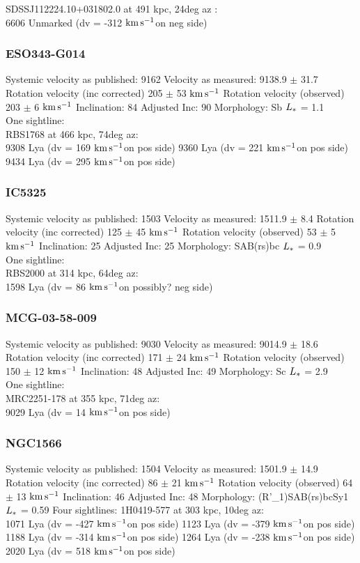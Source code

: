 \documentclass[iop]{emulateapj-rtx4}
\newcommand{\kms}{$\rm km\, s^{-1}$}
\begin{document}
SDSSJ112224.10+031802.0 at 491 kpc, 24deg az : \\
6606 Unmarked (dv = -312 \kms on neg side)



\subsubsection{ESO343-G014}
Systemic velocity as published: 9162
Velocity as measured: 9138.9 $\pm$ 31.7
Rotation velocity (inc corrected) 205 $\pm$ 53 \kms
Rotation velocity (observed) 203 $\pm$ 6 \kms
Inclination: 84
Adjusted Inc: 90
Morphology: Sb
$L_{\**}$ = 1.1 \\

One sightline: \\
RBS1768 at 466 kpc, 74deg az: \\
9308 Lya (dv = 169 \kms on pos side)
9360 Lya (dv = 221 \kms on pos side)
9434 Lya (dv = 295 \kms on pos side)


\subsubsection{IC5325}
Systemic velocity as published: 1503
Velocity as measured: 1511.9 $\pm$ 8.4
Rotation velocity (inc corrected) 125 $\pm$ 45 \kms
Rotation velocity (observed) 53 $\pm$ 5 \kms
Inclination: 25
Adjusted Inc: 25
Morphology: SAB(rs)bc
$L_{\**}$ = 0.9 \\

One sightline: \\
RBS2000 at 314 kpc, 64deg az: \\
1598 Lya (dv = 86 \kms on possibly? neg side)


\subsubsection{MCG-03-58-009}
Systemic velocity as published: 9030
Velocity as measured: 9014.9 $\pm$ 18.6
Rotation velocity (inc corrected) 171 $\pm$ 24 \kms
Rotation velocity (observed) 150 $\pm$ 12 \kms
Inclination: 48
Adjusted Inc: 49
Morphology: Sc
$L_{\**}$ = 2.9 \\

One sightline: \\
MRC2251-178 at 355 kpc, 71deg az: \\
9029 Lya (dv = 14 \kms on pos side)



\subsubsection{NGC1566}
Systemic velocity as published: 1504
Velocity as measured: 1501.9 $\pm$ 14.9
Rotation velocity (inc corrected) 86 $\pm$ 21 \kms
Rotation velocity (observed) 64 $\pm$ 13 \kms
Inclination: 46
Adjusted Inc: 48
Morphology: (R'\_1)SAB(rs)bcSy1
$L_{\**}$ = 0.59
Four sightlines: 
1H0419-577 at 303 kpc, 10deg az: \\
1071 Lya (dv = -427 \kms on pos side)
1123 Lya (dv = -379 \kms on pos side)
1188 Lya (dv = -314 \kms on pos side)
1264 Lya (dv = -238 \kms on pos side)
2020 Lya (dv = 518 \kms on pos side)
\end{document}
